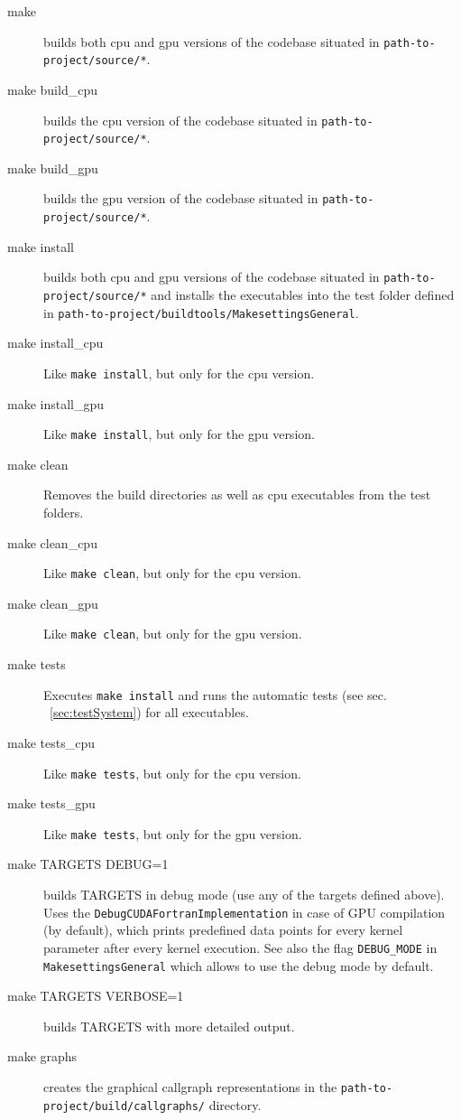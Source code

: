 \begin{description}
 \item[make] builds both cpu and gpu versions of the codebase situated in \linebreak\verb|path-to-project/source/*|.
 \item[make build\_cpu] builds the cpu version of the codebase situated in \verb|path-to-project/source/*|.
 \item[make build\_gpu] builds the gpu version of the codebase situated in \verb|path-to-project/source/*|.
 \item[make install] builds both cpu and gpu versions of the codebase situated in \verb|path-to-project/source/*| and installs the executables into the test folder defined in \verb|path-to-project/buildtools/MakesettingsGeneral|.
 \item[make install\_cpu] Like \verb|make install|, but only for the cpu version.
 \item[make install\_gpu] Like \verb|make install|, but only for the gpu version.
 \item[make clean] Removes the build directories as well as cpu executables from the test folders.
 \item[make clean\_cpu] Like \verb|make clean|, but only for the cpu version.
 \item[make clean\_gpu] Like \verb|make clean|, but only for the gpu version.
 \item[make tests] Executes \verb|make install| and runs the automatic tests (see sec. ~\ref{sec:testSystem}) for all executables.
 \item[make tests\_cpu] Like \verb|make tests|, but only for the cpu version.
 \item[make tests\_gpu] Like \verb|make tests|, but only for the gpu version.
 \item[make TARGETS DEBUG=1] builds TARGETS in debug mode (use any of the targets defined above). Uses the \verb|DebugCUDAFortranImplementation| in case of GPU compilation (by default), which prints predefined data points for every kernel parameter after every kernel execution. See also the flag \verb|DEBUG_MODE| in \verb|MakesettingsGeneral| which allows to use the debug mode by default.
 \item[make TARGETS VERBOSE=1] builds TARGETS with more detailed output.
 \item[make graphs] creates the graphical callgraph representations in the \linebreak\verb|path-to-project/build/callgraphs/| directory.
\end{description}

